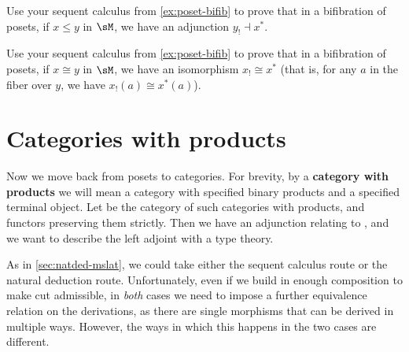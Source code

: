 \begin{ex}\label{ex:poset-bifib-adj}
  Use your sequent calculus from \cref{ex:poset-bifib} to prove that in a bifibration of posets, if $x\le y$ in $\sM$, we have an adjunction $y_! \dashv x^*$.
\end{ex}

\begin{ex}\label{ex:poset-bifib-iso}
  Use your sequent calculus from \cref{ex:poset-bifib} to prove that in a bifibration of posets, if $x\cong y$ in $\sM$, we have an isomorphism $x_! \cong x^*$ (that is, for any $a$ in the fiber over $y$, we have $x_!(a) \cong x^*(a)$).
\end{ex}


\section{Categories with products}
\label{sec:catprod}\label{sec:beta-eta}

Now we move back from posets to categories.
For brevity, by a \textbf{category with products} we will mean a category with specified binary products and a specified terminal object.
Let \bPrCat be the category of such categories with products, and functors preserving them strictly.
Then we have an adjunction relating \bPrCat to \bGr, and we want to describe the left adjoint with a type theory.

As in \cref{sec:natded-mslat}, we could take either the sequent calculus route or the natural deduction route.
Unfortunately, even if we build in enough composition to make cut admissible, in \emph{both} cases we need to impose a further equivalence relation on the derivations, as there are single morphisms that can be derived in multiple ways.
However, the ways in which this happens in the two cases are different.

